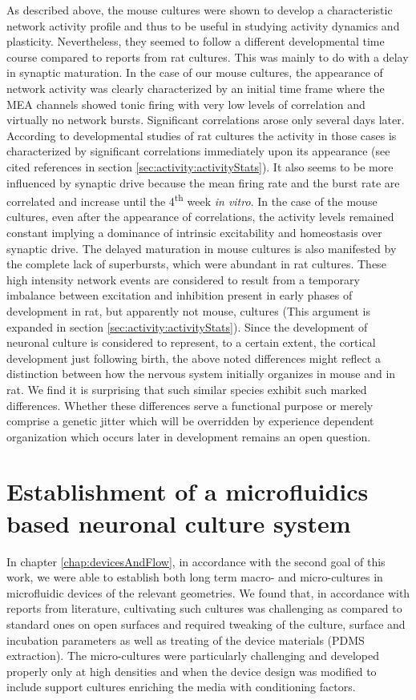 As described above, the mouse cultures were shown to develop a characteristic network activity profile and thus to be useful in studying activity dynamics and plasticity. Nevertheless, they seemed to follow a different developmental time course compared to reports from rat cultures. This was mainly to do with a delay in synaptic maturation. In the case of our mouse cultures, the appearance of network activity was clearly characterized by an initial time frame where the MEA channels showed tonic firing with very low levels of correlation and virtually no network bursts. Significant correlations arose only several days later. According to developmental studies of rat cultures the activity in those cases is characterized by significant correlations immediately upon its appearance (see cited references in section \ref{sec:activity:activityStats}). It also seems to be more influenced by synaptic drive because the mean firing rate and the burst rate are correlated and increase until the 4\textsuperscript{th} week \textit{in vitro}. In the case of the mouse cultures, even after the appearance of correlations, the activity levels remained constant implying a dominance of intrinsic excitability and homeostasis over synaptic drive. The delayed maturation in mouse cultures is also manifested by the complete lack of superbursts, which were abundant in rat cultures. These high intensity network events are considered to result from a temporary imbalance between excitation and inhibition present in early phases of development in rat, but apparently not mouse, cultures (This argument is expanded in section \ref{sec:activity:activityStats}). Since the development of neuronal culture is considered to represent, to a certain extent, the cortical development just following birth, the above noted differences might reflect a distinction between how the nervous system initially organizes in mouse and in rat. We find it is surprising that such similar species exhibit such marked differences. Whether these differences serve a functional purpose or merely comprise a genetic jitter which will be overridden by experience dependent organization which occurs later in development remains an open question.

\section{Establishment of a microfluidics based neuronal culture system}
In chapter \ref{chap:devicesAndFlow}, in accordance with the second goal of this work, we were able to establish both long term macro- and micro-cultures in microfluidic devices of the relevant geometries. We found that, in accordance with reports from literature, cultivating such cultures was challenging as compared to standard ones on open surfaces and required tweaking of the culture, surface and incubation parameters as well as treating of the device materials (PDMS extraction). The micro-cultures were particularly challenging and developed properly only at high densities and when the device design was modified to include support cultures enriching the media with conditioning factors.

